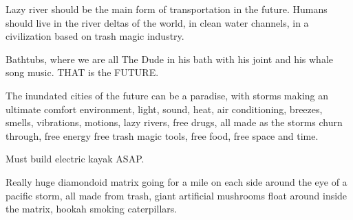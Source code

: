 Lazy river should be the main form of transportation in the future.
Humans should live in the river deltas of the world, in clean water
channels, in a civilization based on trash magic industry.

Bathtubs, where we are all The Dude in his bath with his joint and his
whale song music. THAT is the FUTURE.

The inundated cities of the future can be a paradise, with storms making
an ultimate comfort environment, light, sound, heat, air conditioning,
breezes, smells, vibrations, motions, lazy rivers, free drugs, all made
as the storms churn through, free energy free trash magic tools, free
food, free space and time.

Must build electric kayak ASAP.

Really huge diamondoid matrix going for a mile on each side around the
eye of a pacific storm, all made from trash, giant artificial mushrooms
float around inside the matrix, hookah smoking caterpillars.
